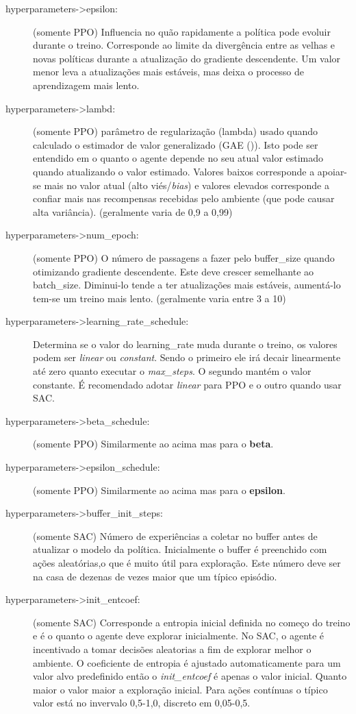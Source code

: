 \begin{description}
   \item [hyperparameters->epsilon:] (somente PPO) Influencia no quão rapidamente a política pode evoluir durante o treino. Corresponde ao limite da divergência entre as velhas e novas políticas durante a atualização do gradiente descendente. Um valor menor leva a atualizações mais estáveis, mas deixa o processo de aprendizagem mais lento.
   \item [hyperparameters->lambd:] (somente PPO) parâmetro de regularização (lambda) usado quando calculado o estimador de valor generalizado (GAE ()). Isto pode ser entendido em o quanto o agente depende no seu atual valor estimado quando atualizando o valor estimado. Valores baixos corresponde a apoiar-se mais no valor atual (alto viés/\textit{bias}) e valores elevados corresponde a confiar mais nas recompensas recebidas pelo ambiente (que pode causar alta variância). (geralmente varia de 0,9 a 0,99)
   \item [hyperparameters->num\_epoch:] (somente PPO) O número de passagens a fazer pelo buffer\_size quando otimizando gradiente descendente. Este deve crescer semelhante ao batch\_size. Diminui-lo tende a ter atualizações mais estáveis, aumentá-lo tem-se um treino mais lento. (geralmente varia entre 3 a 10)
   \item [hyperparameters->learning\_rate\_schedule:] Determina se o valor do learning\_rate muda durante o treino, os valores podem ser \textit{linear} ou \textit{constant}. Sendo o primeiro ele irá decair linearmente até zero quanto executar o \textit{max\_steps}. O segundo mantém o valor constante. É recomendado adotar \textit{linear} para PPO e o outro quando usar SAC.
   \item [hyperparameters->beta\_schedule:] (somente PPO) Similarmente ao acima mas para o \textbf{beta}. 
   \item [hyperparameters->epsilon\_schedule:] (somente PPO) Similarmente ao acima mas para o \textbf{epsilon}. 
   \item [hyperparameters->buffer\_init\_steps:] (somente SAC) Número de experiências a coletar no buffer antes de atualizar o modelo da política. Inicialmente o buffer é preenchido com ações aleatórias,o que é muito útil para exploração. Este número deve ser na casa de dezenas de vezes maior que um típico episódio.
   \item [hyperparameters->init\_entcoef:] (somente SAC) Corresponde a entropia inicial definida no começo do treino e é o quanto o agente deve explorar inicialmente. No SAC, o agente é incentivado a tomar decisões aleatorias a fim de explorar melhor o ambiente. O coeficiente de entropia é ajustado automaticamente para um valor alvo predefinido então o \textit{init\_entcoef} é apenas o valor inicial. Quanto maior o valor maior a exploração inicial. Para ações contínuas o típico valor está no invervalo 0,5-1,0, discreto em 0,05-0,5.

\end{description}
